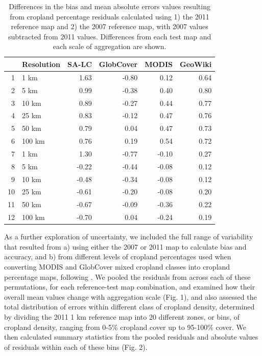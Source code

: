 \documentclass[11pt, titlepage]{article}
\begin{document}
\begin{table}[!ht]
\caption{Differences in the bias and mean absolute errors values resulting from cropland percentage residuals calculated using 1) the 2011 reference map and 2) the 2007 reference map, with 2007 values subtracted from 2011 values. Differences from each test map and each scale of aggregation are shown. }
\centering
\begin{tabular}{rlrrrr}
  \hline
 & Resolution & SA-LC & GlobCover & MODIS & GeoWiki \\ 
  \hline
1 & 1 km & 1.63 & -0.80 & 0.12 & 0.64 \\ 
  2 & 5 km & 0.99 & -0.38 & 0.40 & 0.80 \\ 
  3 & 10 km & 0.89 & -0.27 & 0.44 & 0.77 \\ 
  4 & 25 km & 0.83 & -0.12 & 0.47 & 0.76 \\ 
  5 & 50 km & 0.79 & 0.04 & 0.47 & 0.73 \\ 
  6 & 100 km & 0.76 & 0.19 & 0.54 & 0.72 \\ 
  7 & 1 km & 1.30 & -0.77 & -0.10 & 0.27 \\ 
  8 & 5 km & -0.22 & -0.44 & -0.08 & 0.12 \\ 
  9 & 10 km & -0.48 & -0.34 & -0.08 & 0.12 \\ 
  10 & 25 km & -0.61 & -0.20 & -0.08 & 0.20 \\ 
  11 & 50 km & -0.67 & -0.09 & -0.36 & 0.22 \\ 
  12 & 100 km & -0.70 & 0.04 & -0.24 & 0.19 \\ 
   \hline
\end{tabular}
\end{table}

As a further exploration of uncertainty, we included the full range of variability that resulted from a) using either the 2007 or 2011 map to calculate bias and accuracy, and b) from different levels of cropland percentages used when converting MODIS and GlobCover mixed cropland classes into cropland percentage maps, following \citet{fritz_mapping_2015}. We pooled the residuals from across each of these permutations, for each reference-test map combination, and examined how their overall mean values change with aggregation scale (Fig. 1), and also assessed the total distribution of errors within different class of cropland density, determined by dividing the 2011 1 km reference map into 20 different zones, or bins, of cropland density, ranging from 0-5\% cropland cover up to 95-100\% cover. We then calculated summary statistics from the pooled residuals and absolute values of residuals within each of these bins (Fig. 2).   
\end{document}
